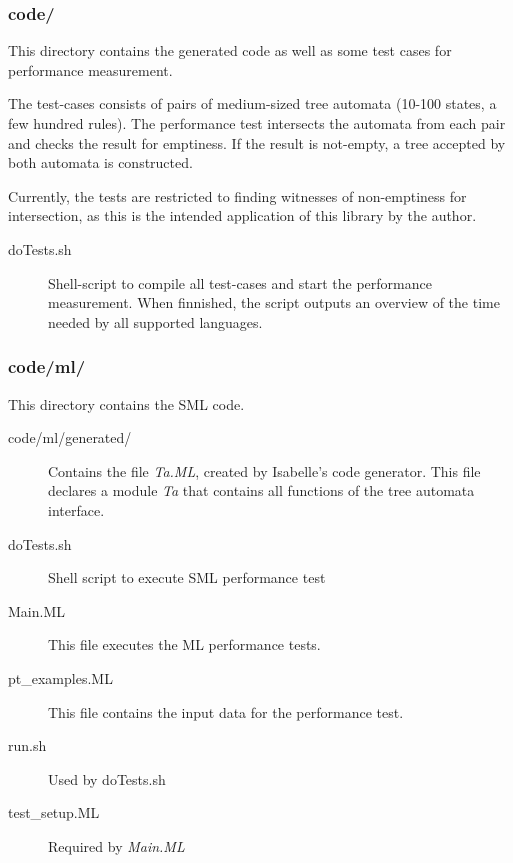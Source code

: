 \subsubsection{code/}
  This directory contains the generated code as well as some test cases for performance measurement.

  The test-cases consists of pairs of medium-sized tree automata (10-100 states, a few hundred rules). The performance test intersects 
  the automata from each pair and checks the result for emptiness. If the result is not-empty, a tree accepted by both automata is constructed.

  Currently, the tests are restricted to finding witnesses of non-emptiness for intersection, as this is the intended application of this library by the author.
  \begin{description}
    \item[doTests.sh] Shell-script to compile all test-cases and start the performance measurement. 
                      When finnished, the script outputs an overview of the time needed by all supported languages.
  \end{description}

\subsubsection{code/ml/}
  This directory contains the SML code. 
  \begin{description}
    \item[code/ml/generated/] Contains the file {\em Ta.ML}, created by Isabelle's code generator. This file declares
                              a module {\em Ta} that contains all functions of the tree automata interface.
    \item[doTests.sh] Shell script to execute SML performance test
    \item[Main.ML] This file executes the ML performance tests.
    \item[pt\_examples.ML] This file contains the input data for the performance test.
    \item[run.sh] Used by doTests.sh
    \item[test\_setup.ML] Required by {\em Main.ML}
  \end{description}

